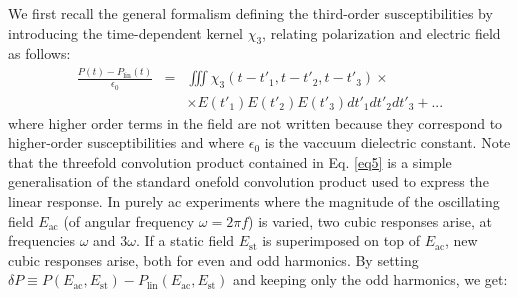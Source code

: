 \documentclass[single column,pre]{revtex4}
\begin{document}
We first recall the general formalism defining the third-order susceptibilities by introducing the time-dependent kernel $\chi_3$, relating polarization and electric field as follows: 
\begin{eqnarray}
\frac{P(t)-P_{\text{lin}}(t)}{\epsilon_0} &=&   
\iiint  \chi_{3}(t-t'_1, t-t'_2,t-t'_{3}) \times \nonumber \\
\  &\ & \times  E(t'_1) E(t'_2) E(t'_{3}) dt'_1 dt'_2 dt'_{3} + ...
\label{eq5}
\end{eqnarray} 
where higher order terms in the field are not written because they correspond to higher-order susceptibilities and where $\epsilon_0$ is the vaccuum  dielectric constant. 
Note that the threefold convolution product contained in Eq. \ref{eq5} is a simple generalisation of the standard onefold convolution product used to express the linear response. 
In purely ac experiments where the magnitude of the oscillating field $E_{\text{ac}}$ (of 
angular frequency $\omega = 2 \pi f$) is varied, two cubic responses arise, at frequencies $\omega$ and $3 \omega$. If a static field $E_{\text{st}}$ is superimposed on top of $E_{\text{ac}}$, new cubic responses arise, both for even and odd harmonics. By setting $\delta P  \equiv P(E_{\text{ac}},E_{\text{st}}) - P_{\text{lin}}(E_{\text{ac}},E_{\text{st}})$ and keeping only the odd harmonics, we get:  
\end{document}
